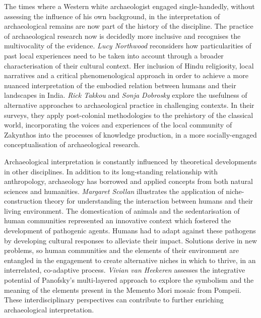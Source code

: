 The times where a Western white archaeologist engaged single-handedly, without assessing the influence of his own background, in the interpretation of archaeological remains are now part of the history of the discipline. The practice of archaeological research now is decidedly more inclusive and recognises the multivocality of the evidence. \emph{Lucy Northwood} reconsiders how particularities of past local experiences need to be taken into account through a broader characterisation of their cultural context. Her inclusion of Hindu religiosity, local narratives and a critical phenomenological approach in order to achieve a more nuanced interpretation of the embodied relation between humans and their landscapes in India. \emph{Rick Takkou} and \emph{Sonja Dobrosky} explore the usefulness of alternative approaches to archaeological practice in challenging contexts. In their surveys, they apply post-colonial methodologies to the prehistory of the classical world, incorporating the voices and experiences of the local community of Zakynthos into the processes of knowledge production, in a more socially-engaged conceptualisation of archaeological research.
		 
Archaeological interpretation is constantly influenced by theoretical developments in other disciplines. In addition to its long-standing relationship with anthropology, archaeology has borrowed and applied concepts from both natural sciences and humanities. \emph{Margaret Scollan} illustrates the application of niche-construction theory for understanding the interaction between humans and their living environment. The domestication of animals and the sedentarisation of human communities represented an innovative context which fostered the development of pathogenic agents. Humans had to adapt against these pathogens by developing cultural responses to alleviate their impact. Solutions derive in new problems, so human communities and the elements of their environment are entangled in the engagement to create alternative niches in which to thrive, in an interrelated, co-adaptive process. \emph{Vivian van Heekeren} assesses the integrative potential of Panofsky’s multi-layered approach to explore the symbolism and the meaning of the elements present in the Memento Mori mosaic from Pompeii. These interdisciplinary perspectives can contribute to further enriching archaeological interpretation.
		 
